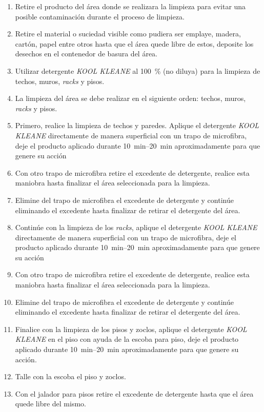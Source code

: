 \begin{enumerate}
    \item Retire el producto del área donde se realizara la limpieza para evitar una posible contaminación durante el proceso de limpieza.
    \item Retire el material o suciedad visible como pudiera ser emplaye, madera, cartón, papel entre otros hasta que el área quede libre de estos, deposite los desechos en el contenedor de basura del área.
    \item Utilizar detergente \emph{KOOL KLEANE} al \qty{100}{\percent} (no diluya) para la limpieza de techos, muros, \textit{racks} y pisos.
    \item La limpieza del área se debe realizar en el siguiente orden: techos, muros, \textit{racks} y pisos.
    \item Primero, realice la limpieza de techos y paredes. Aplique el detergente \emph{KOOL KLEANE} directamente de manera superficial con un trapo de microfibra, deje el producto aplicado durante \qtyrange{10}{20}{\minute} aproximadamente para que genere su acción
    \item Con otro trapo de microfibra retire el excedente de detergente, realice esta maniobra hasta finalizar el área seleccionada para la limpieza.
    \item Elimine del trapo de microfibra el excedente de detergente y continúe eliminando el excedente hasta finalizar de retirar el detergente del área.
    \item Continúe con la limpieza de los \textit{racks}, aplique el detergente \emph{KOOL KLEANE} directamente de manera superficial con un trapo de microfibra, deje el producto aplicado durante \qtyrange{10}{20}{\minute} aproximadamente para que genere su acción
    \item Con otro trapo de microfibra retire el excedente de detergente, realice esta maniobra hasta finalizar el área seleccionada para la limpieza.
    \item Elimine del trapo de microfibra el excedente de detergente y continúe eliminando el excedente hasta finalizar de retirar el detergente del área.
    \item Finalice con la limpieza de los pisos y zoclos, aplique el detergente \emph{KOOL KLEANE} en el piso con ayuda de la escoba para piso, deje el producto aplicado durante \qtyrange{10}{20}{\minute} aproximadamente para que genere su acción.
    \item Talle con la escoba el piso y zoclos.
    \item Con el jalador para pisos retire el excedente de detergente hasta que el área quede libre del mismo.

\end{enumerate}
